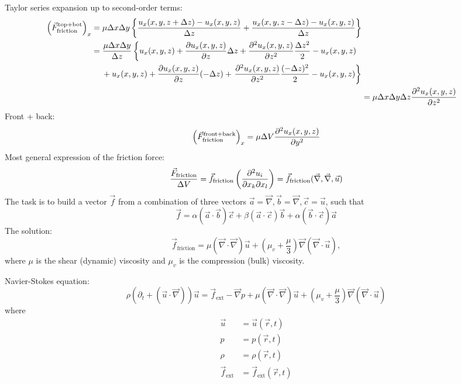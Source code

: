 Taylor series expansion up to second-order terms:
\begin{align}
\begin{split}
\left(\vec{F}_\mathrm{friction}^\mathrm{top+bot}\right)_x &= 
\mu \Delta x\Delta y \left\{\frac{u_x(x,y,z+\Delta z)-u_x(x,y,z)}{\Delta z} +  \frac{u_x(x,y,z-\Delta z)-u_x(x,y,z)}{\Delta z}\right\}\\
&= \frac{\mu\Delta x  \Delta y}{\Delta z}
\left\{u_x(x,y,z)+\frac{\partial u_x(x,y,z)}{\partial z}\Delta z + \frac{\partial^2 u_x(x,y,z)}{\partial z^2}\frac{\Delta z^2}{2} - u_x(x,y,z) \right.\\
&\hspace{4.5mm}  + u_x(x,y,z)+\frac{\partial u_x(x,y,z)}{\partial z}(-\Delta z) + \left. \frac{\partial^2 u_x(x,y,z)}{\partial z^2}\frac{(-\Delta z)^2}{2} - u_x(x,y,z) \right\}
\end{split}\\
&= \mu \Delta x \Delta y \Delta z \frac{\partial^2 u_x(x,y,z)}{\partial z^2}
\end{align}
Front + back:
\begin{equation}
\left(\vec{F}_\mathrm{friction}^\mathrm{front+back}\right)_x = \mu\Delta V \frac{\partial^2 u_x(x,y,z)}{\partial y^2}
\end{equation}
Most general expression of the friction force:
\begin{equation}
\frac{\vec{F}_\mathrm{friction}}{\Delta V} = \vec{f}_\mathrm{friction} \left(\frac{\partial ^2u_i}{\partial x_k\partial x_l}\right) = \vec{f}_\mathrm{friction} (\vec{\nabla},\vec{\nabla},\vec{u})
\end{equation}
The task is to build a vector $\vec{f}$ from a combination of three vectors $\vec{a}=\vec{\nabla}, \vec{b}=\vec{\nabla}, \vec{c}=\vec{u}$, such that
\begin{equation}
\vec{f} = \alpha\left(\vec{a}\cdot\vec{b}\right)\vec{c} + \beta\left(\vec{a}\cdot\vec{c}\right)\vec{b} + \alpha \left(\vec{b}\cdot\vec{c}\right)\vec{a}
\end{equation}
The solution:
\begin{equation}
\vec{f}_\mathrm{friction} = \mu\left(\vec{\nabla}\cdot\vec{\nabla}\right)\vec{u} + \left(\mu_v+\frac{\mu}{3}\right)\vec{\nabla}\left(\vec{\nabla}\cdot\vec{u}\right),
\end{equation}
where $\mu$ is the shear (dynamic) viscosity and $\mu_v$ is the compression (bulk) viscosity.

Navier-Stokes equation:
\begin{equation}
\rho\left(\partial_t+\left(\vec{u}\cdot\vec{\nabla}\right)\right)\vec{u} = \vec{f}_\mathrm{ext}-\vec{\nabla}p + \mu\left(\vec{\nabla}\cdot\vec{\nabla}\right)\vec{u} + \left(\mu_v+\frac{\mu}{3}\right)\vec{\nabla}\left(\vec{\nabla}\cdot\vec{u}\right)
\end{equation}
where
\begin{align}
\vec{u} &= \vec{u}\left(\vec{r},t\right)\\
p &= p\left(\vec{r},t\right)\\
\rho &= \rho\left(\vec{r},t\right)\\
\vec{f}_\mathrm{ext} &= \vec{f}_\mathrm{ext}\left(\vec{r},t\right)
\end{align}


